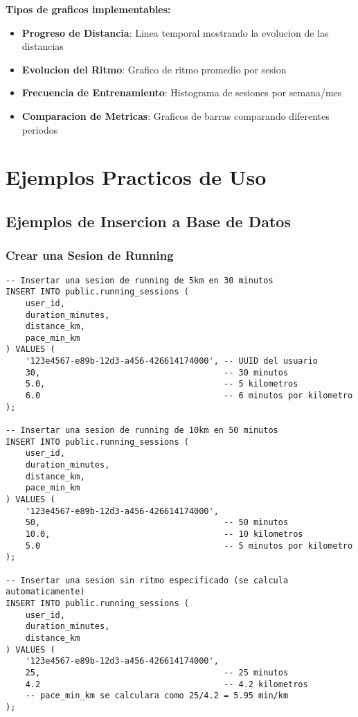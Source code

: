 \documentclass[12pt,a4paper]{article}
\begin{document}
\textbf{Tipos de graficos implementables:}
\begin{itemize}
    \item \textbf{Progreso de Distancia}: Linea temporal mostrando la evolucion de las distancias
    \item \textbf{Evolucion del Ritmo}: Grafico de ritmo promedio por sesion
    \item \textbf{Frecuencia de Entrenamiento}: Histograma de sesiones por semana/mes
    \item \textbf{Comparacion de Metricas}: Graficos de barras comparando diferentes periodos
\end{itemize}

\section{Ejemplos Practicos de Uso}

\subsection{Ejemplos de Insercion a Base de Datos}

\subsubsection{Crear una Sesion de Running}

\begin{lstlisting}[style=sqlstyle, caption=Ejemplo de insercion en running_sessions]
-- Insertar una sesion de running de 5km en 30 minutos
INSERT INTO public.running_sessions (
    user_id,
    duration_minutes,
    distance_km,
    pace_min_km
) VALUES (
    '123e4567-e89b-12d3-a456-426614174000', -- UUID del usuario
    30,                                     -- 30 minutos
    5.0,                                    -- 5 kilometros
    6.0                                     -- 6 minutos por kilometro
);

-- Insertar una sesion de running de 10km en 50 minutos
INSERT INTO public.running_sessions (
    user_id,
    duration_minutes,
    distance_km,
    pace_min_km
) VALUES (
    '123e4567-e89b-12d3-a456-426614174000',
    50,                                     -- 50 minutos
    10.0,                                   -- 10 kilometros
    5.0                                     -- 5 minutos por kilometro
);

-- Insertar una sesion sin ritmo especificado (se calcula automaticamente)
INSERT INTO public.running_sessions (
    user_id,
    duration_minutes,
    distance_km
) VALUES (
    '123e4567-e89b-12d3-a456-426614174000',
    25,                                     -- 25 minutos
    4.2                                     -- 4.2 kilometros
    -- pace_min_km se calculara como 25/4.2 = 5.95 min/km
);
\end{lstlisting}
\end{document}
